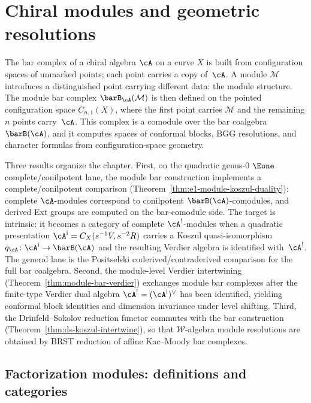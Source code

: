\chapter{Chiral modules and geometric resolutions}
\label{chap:chiral-modules}

\providecommand{\SpCh}{\mathrm{Sp}^{\mathrm{ch}}}
\providecommand{\PhiFA}{\Phi^{\mathrm{FA}}}


The bar complex of a chiral algebra $\cA$ on a curve $X$ is built from
configuration spaces of unmarked points; each point carries a copy
of~$\cA$. A module $\mathcal{M}$ introduces a distinguished point
carrying different data: the module structure. The module bar complex
$\barB_\cA(\mathcal{M})$ is then defined on the pointed configuration
space $\overline{C}_{n,1}(X)$, where the first point carries
$\mathcal{M}$ and the remaining $n$ points carry~$\cA$. This complex
is a comodule over the bar coalgebra $\barB(\cA)$, and it computes
spaces of conformal blocks, BGG resolutions, and character formulas
from configuration-space geometry.

Three results organize the chapter. First, on the quadratic genus-$0$
$\Eone$ complete/conilpotent lane, the module bar construction
implements a complete/conilpotent comparison
(Theorem~\ref{thm:e1-module-koszul-duality}): complete
$\cA$-modules correspond to conilpotent $\barB(\cA)$-comodules,
and derived Ext groups are computed on the bar-comodule side. The
target is intrinsic: it becomes a category of complete $\cA^!$-modules
when a quadratic presentation
$\cA^{\mathrm{i}}=C_X(s^{-1}V,s^{-2}R)$ carries a Koszul
quasi-isomorphism
$q_\cA\colon\cA^{\mathrm i}\to\barB(\cA)$ and the resulting Verdier
algebra is identified with~$\cA^!$.  The general lane is the
Positselski coderived/contraderived comparison for the full bar
coalgebra. Second, the module-level
Verdier intertwining (Theorem~\ref{thm:module-bar-verdier}) exchanges
module bar complexes after the finite-type Verdier dual algebra
$\cA^!=(\cA^{\mathrm{i}})^\vee$ has been identified, yielding
conformal block identities and dimension invariance under level
shifting. Third, the Drinfeld--Sokolov reduction functor commutes
with the bar construction (Theorem~\ref{thm:ds-koszul-intertwine}),
so that $\mathcal{W}$-algebra module resolutions are obtained by
BRST reduction of affine Kac--Moody bar complexes.

\section{Factorization modules: definitions and categories}

